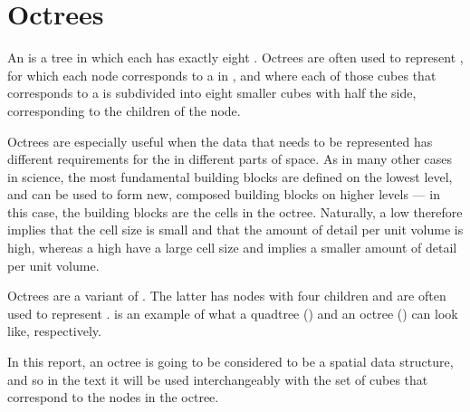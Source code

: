 \chapter{Octrees}
\label{chap:octrees}

An \octree is a tree  in which each  has exactly eight . Octrees are often used to represent , for which each node corresponds to a \cube in , and where each of those cubes that corresponds to a  is subdivided into eight smaller cubes with half the side, corresponding to the children of the node.

Octrees are especially useful when the data that needs to be represented has different requirements for the \LOD in different parts of space. As in many other cases in science, the most fundamental building blocks are defined on the lowest level, and can be used to form new, composed building blocks on higher levels --- in this case, the building blocks are the cells in the octree. Naturally, a low \LOD therefore implies that the cell size is small and that the amount of detail per unit volume is high, whereas a high \LOD have a large cell size and implies a smaller amount of detail per unit volume.

Octrees are a variant of \quadtrees. The latter has nodes with four children and are often used to represent .  is an example of what a quadtree () and an octree () can look like, respectively.

In this report, an octree is going to be considered to be a spatial data structure, and so in the text it will be used interchangeably with the set of cubes that correspond to the nodes in the octree.

